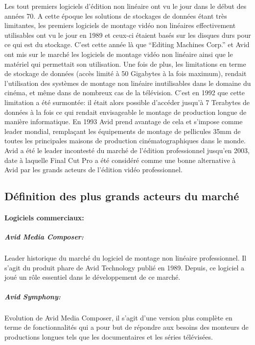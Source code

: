 Les tout premiers logiciels d'édition non linéaire ont vu le jour dans
le début des années 70.  A cette époque les solutions de stockages
de données étant très limitantes, les premiers logiciels de montage
vidéo non linéaires effectivement utilisables ont vu le jour en
1989 et ceux-ci étaient basés sur les disques durs pour ce qui est du
stockage. C'est cette année là que ``Editing Machines Corp.'' et Avid
ont mis sur le marché les logiciels de montage vidéo non linéaire
ainsi que le matériel qui permettait son utilisation. Une fois de plus,
les limitations en terme de stockage de données (accès limité à
50 Gigabytes à la fois maximum), rendait l'utilisation des systèmes
de montage non linéaire inutilisables dans le domaine du cinéma,
et même dans de nombreux cas de la télévision. C'est en 1992 que
cette limitation a été surmontée: il était alors possible d'accéder
jusqu'à 7 Terabytes de données à la fois ce qui rendait envisageable
le montage de production longue de manière informatique. En
1993 Avid prend avantage de cela et s'impose comme leader mondial,
remplaçant les équipements de montage de pellicules 35mm de toutes
les principales maisons de production cinématographiques dans le
monde. Avid a été le leader incontesté du marché de l'édition
professionnel jusqu'en 2003, date à laquelle Final Cut Pro a été
considéré comme une bonne alternative à Avid par les grands acteurs
de l'édition vidéo professionnel.

\subsection{Définition des plus grands acteurs du marché}

\paragraph {Logiciels commerciaux:}

\subparagraph{Avid Media Composer:}

Leader historique du marché du logiciel de montage non linéaire
professionnel. Il s'agit du produit phare de Avid Technology publié
en 1989. Depuis, ce logiciel a joué un rôle essentiel dans le
développement de ce marché.

\subparagraph{Avid Symphony:}

Evolution de Avid Media Composer, il s'agit d'une version plus complète
en terme de fonctionnalités qui a pour but de répondre aux besoins
des monteurs de productions longues tels que les documentaires et les
séries télévisées.

